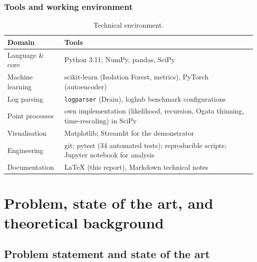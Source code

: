 \documentclass[11pt,a4paper]{report}
\newcommand{\code}[1]{\texttt{\small #1}}
\begin{document}
\section{Tools and working environment}
\begin{table}[H]
\centering
\caption{Technical environment.}
\label{tab:tools}
\small
\renewcommand{\arraystretch}{1.25}
\begin{tabular}{@{}l p{9.8cm}@{}}
\toprule
\textbf{Domain} & \textbf{Tools} \\
\midrule
Language \& core & Python 3.11; NumPy, pandas, SciPy \\
Machine learning & scikit-learn (Isolation Forest, metrics), PyTorch
(autoencoder) \\
Log parsing & \code{logparser} (Drain), loghub benchmark configurations \\
Point processes & own implementation (likelihood, recursion, Ogata thinning,
time-rescaling) in SciPy \\
Visualisation & Matplotlib; Streamlit for the demonstrator \\
Engineering & git; pytest (34 automated tests); reproducible scripts;
Jupyter notebook for analysis \\
Documentation & \LaTeX{} (this report), Markdown technical notes \\
\bottomrule
\end{tabular}
\end{table}

\part{Problem, state of the art, and theoretical background}

\chapter{Problem statement and state of the art}
\label{ch:stateofart}
\end{document}
